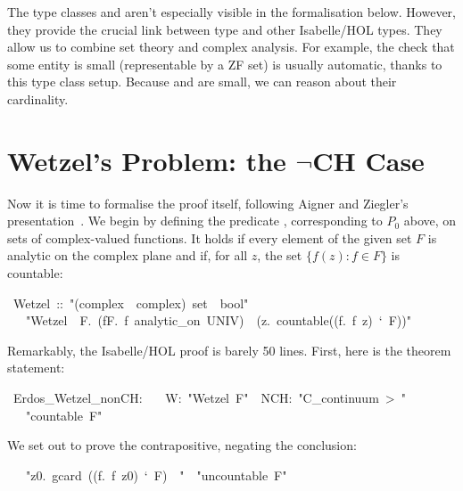 \documentclass[runningheads]{llncs}
\begin{document}
The type classes  and  aren't especially visible in the formalisation below.
However, they provide the crucial link between type  and other Isabelle/HOL types. They allow us to combine set theory and complex analysis. For example, the check that some entity is small (representable by a ZF set) is usually automatic, thanks to this type class setup.
Because  and  are small, we can reason about their cardinality.

\section{Wetzel's Problem: the $\neg$CH Case}

Now it is time to formalise the proof itself, following Aigner and Ziegler's presentation~\cite{aigner-proofs}.
We begin by defining the predicate , corresponding to $P_0$ above, on sets of complex-valued functions. It holds if every element of the given set $F$ is analytic on the complex plane and if, for all $z$, the set $\{f(z) : f\in F\}$ is countable:
\begin{isabelle}
\ Wetzel\ ::\ "(complex\ \isasymRightarrow \ complex)\ set\ \isasymRightarrow \ bool"\isanewline
\ \ \ "Wetzel\ \isasymequiv \ \isasymlambda F.\ (\isasymforall f\isasymin F.\ f\ analytic\_on\ UNIV)\ \isasymand\ (\isasymforall z.\ countable((\isasymlambda f.\ f\ z)\ `\ F))"
\end{isabelle}

Remarkably, the Isabelle/HOL proof is barely 50 lines. First, here is the theorem statement:
\begin{isabelle}
\ Erdos\_Wetzel\_nonCH:\isanewline
\ \ \ W:\ "Wetzel\ F"\ \ NCH:\ "C\_continuum\ >\ "\isanewline
\ \ \ "countable\ F"
\end{isabelle}

We set out to prove the contrapositive, negating the conclusion:
\begin{isabelle}
\ \ \ "\isasymexists z0.\ gcard\ ((\isasymlambda f.\ f\ z0)\ `\ F)\ \isasymge \ "\ \ "uncountable\ F"
\end{isabelle}
\end{document}
